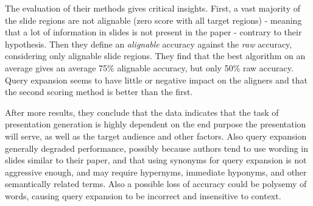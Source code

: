 \documentclass[conference]{IEEEtran}
\begin{document}
The evaluation of their methods gives critical insights. First, a vast majority of the slide regions are
not alignable (zero score with all target regions) - meaning that a lot of information in slides is not
present in the paper - contrary to their hypothesis. Then they define an \textit{alignable} accuracy against
the \textit{raw} accuracy, considering only alignable slide regions. They find that the best algorithm
on an average gives an average 75\% alignable accuracy, but only 50\% raw accuracy. Query expansion seems
to have little or negative impact on the aligners and that the second scoring method is better than
the first.

After more results, they conclude that the data indicates that the task of presentation generation
is highly dependent on the end purpose the presentation will serve, as well as the target audience and other
factors. Also query expansion generally degraded performance, possibly because authors tend to use wording in
slides similar to their paper, and that using synonyms for query expansion is not aggressive enough, and may
require hypernyms, immediate hyponyms, and other semantically related terms. Also a possible loss of accuracy
could be polysemy of words, causing query expansion to be incorrect and insensitive to context.


{\small


}
\end{document}
